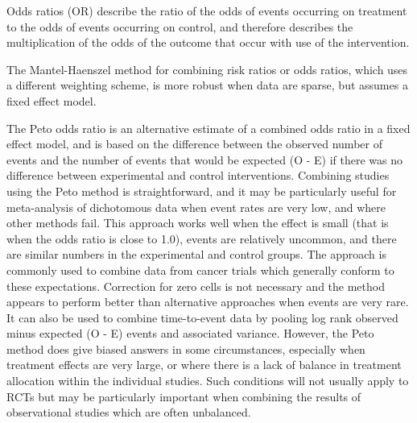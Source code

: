 \documentclass[
  11pt,
  a4paper,
  DIV=11,
  numbers=noendperiod]{scrreprt}
\begin{document}
Odds ratios (OR) describe the ratio of the odds of events occurring on
treatment to the odds of events occurring on control, and therefore
describes the multiplication of the odds of the outcome that occur with
use of the intervention.

The Mantel-Haenszel method for combining risk ratios or odds ratios,
which uses a different weighting scheme, is more robust when data are
sparse, but assumes a fixed effect model.

The Peto odds ratio is an alternative estimate of a combined odds ratio
in a fixed effect model, and is based on the difference between the
observed number of events and the number of events that would be
expected (O - E) if there was no difference between experimental and
control interventions. Combining studies using the Peto method is
straightforward, and it may be particularly useful for meta-analysis of
dichotomous data when event rates are very low, and where other methods
fail. This approach works well when the effect is small (that is when
the odds ratio is close to 1.0), events are relatively uncommon, and
there are similar numbers in the experimental and control groups. The
approach is commonly used to combine data from cancer trials which
generally conform to these expectations. Correction for zero cells is
not necessary and the method appears to perform better than alternative
approaches when events are very rare. It can also be used to combine
time-to-event data by pooling log rank observed minus expected (O - E)
events and associated variance. However, the Peto method does give
biased answers in some circumstances, especially when treatment effects
are very large, or where there is a lack of balance in treatment
allocation within the individual studies. Such conditions will not
usually apply to RCTs but may be particularly important when combining
the results of observational studies which are often unbalanced.
\end{document}
